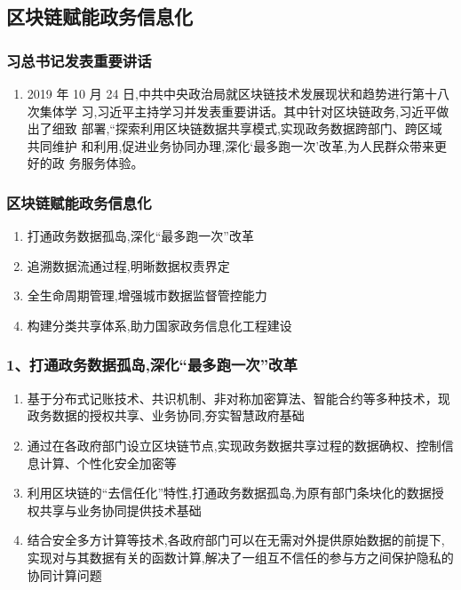 \documentclass[11pt]{beamer}
\begin{document}
\subsection{区块链赋能政务信息化}
\begin{frame}
	\frametitle{习总书记发表重要讲话}
	\begin{enumerate}
		\item 2019 年
		      10 月 24 日,中共中央政治局就区块链技术发展现状和趋势进行第十八次集体学
		      习,习近平主持学习并发表重要讲话。其中针对区块链政务,习近平做出了细致
		      部署,“探索利用区块链数据共享模式,实现政务数据跨部门、跨区域共同维护
		      和利用,促进业务协同办理,深化‘最多跑一次’改革,为人民群众带来更好的政
		      务服务体验。
	\end{enumerate}
\end{frame}

\begin{frame}
	\frametitle{区块链赋能政务信息化}
	\begin{enumerate}
		\item 打通政务数据孤岛,深化“最多跑一次”改革
		\item 追溯数据流通过程,明晰数据权责界定
		\item 全生命周期管理,增强城市数据监督管控能力
		\item 构建分类共享体系,助力国家政务信息化工程建设
	\end{enumerate}
\end{frame}

\begin{frame}
	\frametitle{1、打通政务数据孤岛,深化“最多跑一次”改革}
	\begin{enumerate}
		\item 基于分布式记账技术、共识机制、非对称加密算法、智能合约等多种技术，现政务数据的授权共享、业务协同,夯实智慧政府基础
		\item 通过在各政府部门设立区块链节点,实现政务数据共享过程的数据确权、控制信息计算、个性化安全加密等
		\item 利用区块链的“去信任化”特性,打通政务数据孤岛,为原有部门条块化的数据授权共享与业务协同提供技术基础
		\item 结合安全多方计算等技术,各政府部门可以在无需对外提供原始数据的前提下,实现对与其数据有关的函数计算,解决了一组互不信任的参与方之间保护隐私的协同计算问题
	\end{enumerate}
\end{frame}
\end{document}
